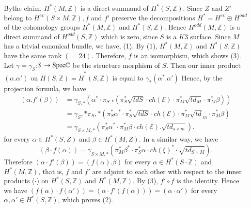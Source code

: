 \begin{pf}
By\pageoriginale the claim, $H^{\ast}(M,\mathbb{Z})$ is a direct
summand of $H^{\ast}(S,\mathbb{Z})$. Since $Z$ and $Z'$ belong to
$H^{e\upsilon}(S\times M,\mathbb{Z}),f$ and $f'$ preserve the
decompositions $H^{\ast}=H^{e\upsilon}\oplus H^{odd}$ of the
cohomology groups $H^{\ast}(M,\mathbb{Z})$ and
$H^{\ast}(S,\mathbb{Z})$. Hence $H^{odd}(M,\mathbb{Z})$ is a direct
summand of $H^{odd}(S,\mathbb{Z})$ which is zero, since $S$ is a $K3$
surface. Since $M$ has a trivial canonical bundle, we have, (1). By
(1), $H^{\ast}(M,\mathbb{Z})$ and $H^{\ast}(S,\mathbb{Z})$ have the
same rank $(=24)$. Therefore, $f$ is an isomorphism, which shows
(3). Let $\gamma=\gamma_S$:$S\to \mathrm{Spec} \mathbb{C}$ be the structure
morphism of $S$. Then our inner product $(\alpha.\alpha')$ on
$\widetilde{H}(S,\mathbb{Z})=\widetilde{H}^{\ast}(S,\mathbb{Z})$ is equal to
$\gamma_{\ast}(\alpha^{\ast}.\alpha')$ Hence, by the projection
formula, we have 
$$
\begin{aligned}
(\alpha.f'(\beta))&=\gamma_{S,\ast}\left(\alpha^{\ast}\cdot \pi_{S,\ast}\left(\pi^{\ast}_S\sqrt{tdS}\cdot
ch(\mathscr{E})\cdot \pi^{\ast}_M\sqrt{td_M}\cdot \pi^{\ast}_M\beta\right)\right)\\
&{}=\gamma_S,\ast \pi_S,\ast\left(\pi^{\ast}_S\alpha^{\ast}\cdot \pi^{\ast}_S\sqrt{tdS}\cdot
ch(\mathscr{E})\cdot \pi^{\ast}_M\sqrt{td}_m\cdot \pi^{\ast}_M\beta\right)\\
&{}=\gamma_{S\times
M,\ast}\left(\pi^{\ast}_S\alpha^{\ast}\cdot \pi^{\ast}_M\beta\cdot
ch(\mathscr{E}).\sqrt{td_{s\times m}}\right).
\end{aligned}
$$
for every $\alpha\in H^{\ast}(S,Z)$ and $\beta \in H^{\ast}(M,Z)$. In a
similar way, we have 
$$
(\beta\cdot f(\alpha))=\gamma_{S\times
M,\ast}\left(\pi^{\ast}_M\beta^{\ast}\cdot \pi^{\ast}_S\alpha\cdot
ch(\xi)^{\ast}\cdot\sqrt{td_{S\times M}}\right).
$$
Therefore $(\alpha\cdot f'(\beta))=(f(\alpha).\beta)$ for every
$\alpha\in H^{\ast}(S\cdot \mathbb{Z})$ and $H^{\ast}(M,\mathbb{Z})$,
that is, $f$ and $f'$ are adjoint to each other with respect to the
inner products ($\cdot$) on $H^{\ast}(S,\mathbb{Z})$ and
$H^{\ast}(M,\mathbb{Z})$. By (3), $f'\circ f$ is the identity. Hence
we have $(f(\alpha)\cdot f(\alpha'))=(\alpha\cdot
f'(f(\alpha)))=(\alpha\cdot \alpha')$ for every $\alpha,\alpha'\in
H^{\ast}(S,\mathbb{Z})$, which proves (2).
\enprf                   
\end{pf}

